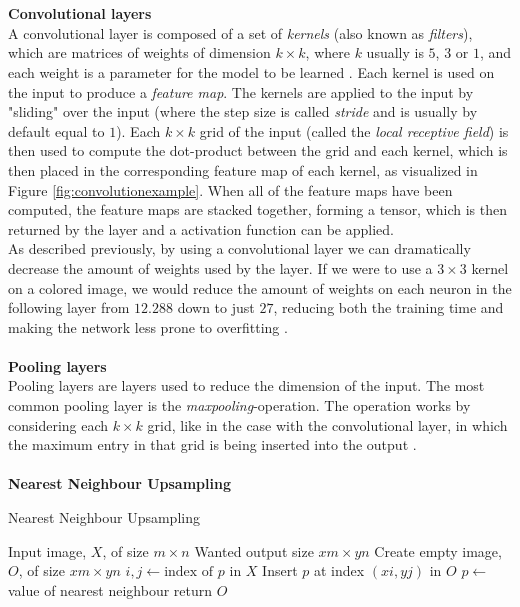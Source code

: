 \documentclass[./main.tex]{subfiles}
\begin{document}
\\
\\
\textbf{Convolutional layers} \\
A convolutional layer is composed of a set of \textit{kernels} (also known as \textit{filters}), which are matrices of weights of dimension $k \times k$, where $k$ usually is $5$, $3$ or $1$, and each weight is a parameter for the model to be learned \cite{Everything}. Each kernel is used on the input to produce a \textit{feature map}. The kernels are applied to the input by "sliding" over the input (where the step size is called \textit{stride} and is usually by default equal to $1$). Each $k \times k$ grid of the input (called the \textit{local receptive field}) is then used to compute the dot-product between the grid and each kernel, which is then placed in the corresponding feature map of each kernel, as visualized in Figure \ref{fig:convolutionexample}. When all of the feature maps have been computed, the feature maps are stacked together, forming a tensor, which is then returned by the layer and a activation function can be applied. \\
As described previously, by using a convolutional layer we can dramatically decrease the amount of weights used by the layer. If we were to use a $3 \times 3$ kernel on a colored image, we would reduce the amount of weights on each neuron in the following layer from $12.288$ down to just $27$, reducing both the training time and making the network less prone to overfitting \cite{CNN}.
\\
\\
\textbf{Pooling layers} \\
Pooling layers are layers used to reduce the dimension of the input. The most common pooling layer is the \textit{maxpooling}-operation. The operation works by considering each $k \times k$ grid, like in the case with the convolutional layer, in which the maximum entry in that grid is being inserted into the output \cite{CNN}.
\\
\\
\textbf{Nearest Neighbour Upsampling} \\
\begin{algorithm}[t]
    \caption{Nearest Neighbour Upsampling \cite{NNUpsampling}}
    \label{Algorithm:NNUpsampling}
    \begin{algorithmic}[1]
        \Require Input image, $X$, of size $m \times n$
        \Require Wanted output size $xm \times yn$
        \State Create empty image, $O$, of size $xm \times yn$
            \State $i,j \gets \text{index of } p \text{ in } X$
            \State Insert $p$ at index $(xi, yj)$ in $O$
        \EndFor
            $p \gets$ value of nearest neighbour
        \EndFor
        return $O$
    \end{algorithmic}
\end{algorithm}
\end{document}
